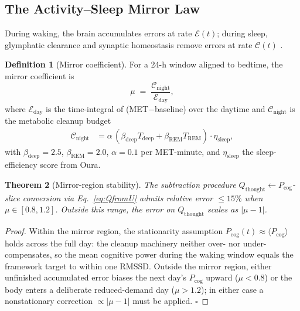 \documentclass[11pt,twocolumn,a4paper]{article}
\newtheorem{theorem}{Theorem}[section]
\theoremstyle{definition}
\newtheorem{definition}[theorem]{Definition}
\theoremstyle{remark}
\newcommand{\Qth}{Q_{\mathrm{thought}}}
\newcommand{\Pcog}{P_{\mathrm{cog}}}
\begin{document}
\subsection{The Activity--Sleep Mirror Law}

During waking, the brain accumulates errors at rate
$\mathcal{E}(t)$; during sleep, glymphatic clearance and synaptic
homeostasis remove errors at rate $\mathcal{C}(t)$
\citep{xie2013,hablitz2020,tononi2014}.

\begin{definition}[Mirror coefficient]
For a 24-h window aligned to bedtime, the mirror coefficient is
\begin{equation}
\mu \;=\; \frac{\mathcal{C}_{\mathrm{night}}}{\mathcal{E}_{\mathrm{day}}},
\end{equation}
where $\mathcal{E}_{\mathrm{day}}$ is the time-integral of
(MET$-$baseline) over the daytime and $\mathcal{C}_{\mathrm{night}}$
is the metabolic cleanup budget
\begin{align}
\mathcal{C}_{\mathrm{night}} &= \alpha\,(\beta_{\mathrm{deep}} T_{\mathrm{deep}} + \beta_{\mathrm{REM}} T_{\mathrm{REM}}) \cdot\eta_{\mathrm{sleep}},
\end{align}
with $\beta_{\mathrm{deep}}=2.5$, $\beta_{\mathrm{REM}}=2.0$,
$\alpha=0.1$ per MET-minute, and $\eta_{\mathrm{sleep}}$ the
sleep-efficiency score from Oura.
\end{definition}

\begin{theorem}[Mirror-region stability]
\label{thm:mirror}
The subtraction procedure
$\Qth\leftarrow \Pcog$-slice conversion via
Eq.~\eqref{eq:QfromU} admits relative error $\le 15\%$ when
$\mu\in[0.8,1.2]$. Outside this range, the error on $\Qth$
scales as $|\mu-1|$.
\end{theorem}

\begin{proof}
Within the mirror region, the stationarity assumption
$\Pcog(t)\approx\langle\Pcog\rangle$ holds across the full day: the
cleanup machinery neither over- nor under-compensates, so the mean
cognitive power during the waking window equals the framework target
to within one RMSSD. Outside the mirror region, either unfinished
accumulated error biases the next day's $\Pcog$ upward
($\mu<0.8$) or the body enters a deliberate reduced-demand day
($\mu>1.2$); in either case a nonstationary correction $\propto
|\mu-1|$ must be applied. $\square$
\end{proof}

\end{document}
